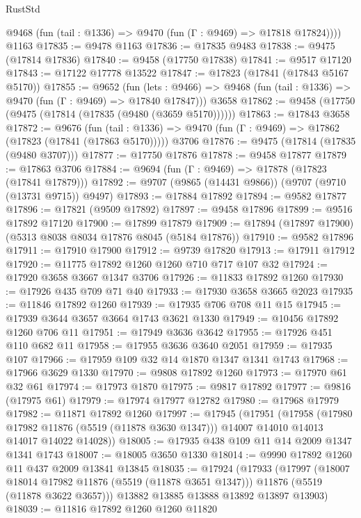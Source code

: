 \begin{lexlean}{RustStd}
\begin{coremodule}
      @9468 (fun (tail : @1336) => @9470 (fun (Γ : @9469) => @17818 @17824))))
    @1163
@17835 := @9478 @1163
@17836 := @17835 @9483
@17838 := @9475 (@17814 @17836)
@17840 := @9458 (@17750 @17838)
@17841 := @9517 @17120
@17843 := @17122 @17778 @13522
@17847 := @17823 (@17841 (@17843 @5167 @5170))
@17855 := @9652
    (fun (lets : @9466) => @9468 (fun (tail : @1336) => @9470 (fun (Γ : @9469) => @17840 @17847)))
    @3658
@17862 := @9458 (@17750 (@9475 (@17814 (@17835 (@9480 (@3659 @5170))))))
@17863 := @17843 @3658
@17872 := @9676
    (fun (tail : @1336) => @9470 (fun (Γ : @9469) => @17862 (@17823 (@17841 (@17863 @5170)))))
    @3706
@17876 := @9475 (@17814 (@17835 (@9480 @3707)))
@17877 := @17750 @17876
@17878 := @9458 @17877
@17879 := @17863 @3706
@17884 := @9694 (fun (Γ : @9469) => @17878 (@17823 (@17841 @17879)))
@17892 := @9707 (@9865 (@14431 @9866)) (@9707 (@9710 (@13731 @9715)) @9497)
@17893 := @17884 @17892
@17894 := @9582 @17877
@17896 := @17821 (@9509 @17892)
@17897 := @9458 @17896
@17899 := @9516 @17892 @17120
@17900 := @17899 @17879
@17909 := @17894 (@17897 @17900) (@5313 @8038 @8034 @17876 @8045 (@5184 @17876))
@17910 := @9582 @17896
@17911 := @17910 @17900
@17912 := @9739 @17820
@17913 := @17911 @17912
@17920 := @11775 @17892 @1260 @1260 @710 @717 @107 @32
@17924 := @17920 @3658 @3667 @1347 @3706
@17926 := @11833 @17892 @1260
@17930 := @17926 @435 @709 @71 @40
@17933 := @17930 @3658 @3665 @2023
@17935 := @11846 @17892 @1260
@17939 := @17935 @706 @708 @11 @15
@17945 := @17939 @3644 @3657 @3664 @1743 @3621 @1330
@17949 := @10456 @17892 @1260 @706 @11
@17951 := @17949 @3636 @3642
@17955 := @17926 @451 @110 @682 @11
@17958 := @17955 @3636 @3640 @2051
@17959 := @17935 @107
@17966 := @17959 @109 @32 @14 @1870 @1347 @1341 @1743
@17968 := @17966 @3629 @1330
@17970 := @9808 @17892 @1260
@17973 := @17970 @61 @32 @61
@17974 := @17973 @1870
@17975 := @9817 @17892
@17977 := @9816 (@17975 @61)
@17979 := @17974 @17977 @12782
@17980 := @17968 @17979
@17982 := @11871 @17892 @1260
@17997 := @17945
    (@17951
      (@17958
        (@17980 @17982 @11876 (@5519 (@11878 @3630 @1347)))
        @14007
        @14010
        @14013
        @14017
        @14022
        @14028))
@18005 := @17935 @438 @109 @11 @14 @2009 @1347 @1341 @1743
@18007 := @18005 @3650 @1330
@18014 := @9990 @17892 @1260 @11 @437 @2009 @13841 @13845
@18035 := @17924
    (@17933
      (@17997
        (@18007 @18014 @17982 @11876 (@5519 (@11878 @3651 @1347)))
        @11876
        (@5519 (@11878 @3622 @3657)))
      @13882
      @13885
      @13888
      @13892
      @13897
      @13903)
@18039 := @11816 @17892 @1260 @1260 @11820

\end{coremodule}
\end{lexlean}

